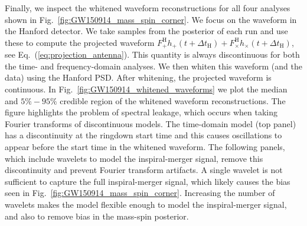 Finally, we inspect the whitened waveform reconstructions for all four analyses shown in Fig.~\ref{fig:GW150914_mass_spin_corner}.
We focus on the waveform in the Hanford detector.
We take samples from the posterior of each run and use these to compute the projected waveform $F^\mathrm{H}_{+} h_+(t+\Delta t_\mathrm{H})+F^\mathrm{H}_{\times} h_\times(t+\Delta t_\mathrm{H})$, see Eq.~(\ref{eq:projection_antenna}). This quantity is always discontinuous for both the time- and frequency-domain analyses.
We then whiten this waveform (and the data) using the Hanford PSD. After whitening, the projected waveform is continuous.
In Fig.~\ref{fig:GW150914_whitened_waveforms} we plot the median and $5\%-95\%$ credible region of the whitened waveform reconstructions.
The figure highlights the problem of spectral leakage, which occurs when taking Fourier transforms of discontinuous models. 
The time-domain model (top panel) has a discontinuity at the ringdown start time and this causes oscillations to appear before the start time in the whitened waveform.
The following panels, which include wavelets to model the inspiral-merger signal, remove this discontinuity and prevent Fourier transform artifacts.
A single wavelet is not sufficient to capture the full inspiral-merger signal, which likely causes the bias seen in Fig.~\ref{fig:GW150914_mass_spin_corner}. 
Increasing the number of wavelets makes the model flexible enough to model the inspiral-merger signal, and also to remove bias in the mass-spin posterior.
